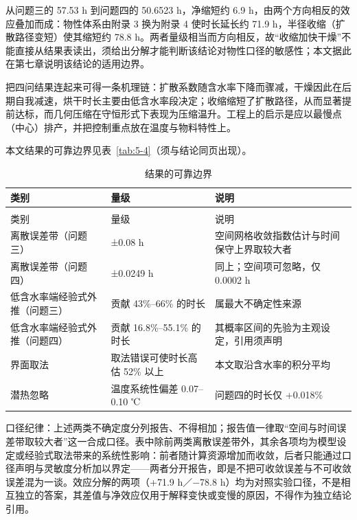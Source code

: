 从问题三的 57.53 h 到问题四的 50.6523 h，净缩短约 6.9 h，由两个方向相反的效应叠加而成：物性体系由附录 3 换为附录 4 使时长延长约 71.9 h，半径收缩（扩散路径变短）使其缩短约 78.8 h。两者量级相当而方向相反，故“收缩加快干燥”不能直接从结果表读出，须给出分解才能判断该结论对物性口径的敏感性；本文据此在第七章说明该结论的适用边界。

把四问结果连起来可得一条机理链：扩散系数随含水率下降而骤减，干燥因此在后期自我减速，烘干时长主要由低含水率段决定；收缩缩短了扩散路径，从而显著提前达标，而几何压缩在守恒形式下表现为压缩温升。工程上的启示是应以最慢点（中心）排产，并把控制重点放在温度与物料特性上。

本文结果的可靠边界见表~\ref{tab:5-4}（须与结论同页出现）。



\begin{longtable}{>{\centering\arraybackslash}m{\dimexpr 0.326\tblw\relax}>{\centering\arraybackslash}m{\dimexpr 0.299\tblw\relax}>{\centering\arraybackslash}m{\dimexpr 0.375\tblw\relax}}
  \caption{结果的可靠边界}\label{tab:5-4-a}\\
  \toprule
    类别 & 量级 & 说明 \\
  \midrule
  \endfirsthead
  \multicolumn{3}{r}{\footnotesize（续）}\\
  \toprule
    类别 & 量级 & 说明 \\
  \midrule
  \endhead
  \bottomrule
  \endfoot
  \bottomrule
  \endlastfoot
  离散误差带（问题三） & ±0.08 h & 空间网格收敛指数估计与时间保守上界取较大者 \\
  离散误差带（问题四） & ±0.0249 h & 同上；空间项可忽略，仅 0.0002 h \\
  低含水率端经验式外推（问题三） & 贡献 43\%–66\% 的时长 & 属最大不确定性来源 \\
  低含水率端经验式外推（问题四） & 贡献 16.8\%–55.1\% 的时长 & 其概率区间的先验为主观设定，引用须声明 \\
  界面取法 & 取法错误可使时长高估 52\% 以上 & 本文取沿含水率的积分平均 \\
  潜热忽略 & 温度系统性偏差 0.07–0.10 ℃ & 问题四的时长仅 +0.018\% \\
\end{longtable}

口径纪律：上述两类不确定度分列报告、不得相加；报告值一律取“空间与时间误差带取较大者”这一合成口径。表中除前两类离散误差带外，其余各项均为模型设定或经验式取法带来的系统性影响：前者随计算资源增加而收敛，后者只能通过口径声明与灵敏度分析加以界定——两者分开报告，即是不把可收敛误差与不可收敛误差混为一谈。效应分解的两项（+71.9 h／−78.8 h）均为对照实验口径，不是相互独立的答案，其差值与净效应仅用于解释变快或变慢的原因，不得作为独立结论引用。

